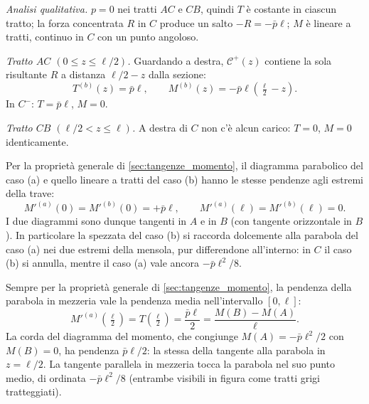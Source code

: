 \begin{esempio}
\begin{svolgimento}
		\textit{Analisi qualitativa.} $p = 0$ nei tratti
		$AC$ e $CB$, quindi $T$ è costante in ciascun
		tratto; la forza concentrata $R$ in $C$ produce
		un salto $-R = -\bar p\ell$; $M$ è lineare a
		tratti, continuo in $C$ con un punto angoloso.
		
		\textit{Tratto $AC$ $(0 \leq z \leq \ell/2)$.}
		Guardando a destra, $\mathcal{C}^+(z)$ contiene
		la sola risultante $R$ a distanza $\ell/2 - z$
		dalla sezione:
		\[
		T^{(b)}(z) = \bar p\ell,
		\qquad
		M^{(b)}(z) = -\bar p\ell\!\left(\tfrac{\ell}{2}-z\right).
		\]
		In $C^-$: $T = \bar p\ell$, $M = 0$.
		
		\textit{Tratto $CB$ $(\ell/2 < z \leq \ell)$.}
		A destra di $C$ non c'è alcun carico: $T = 0$,
		$M = 0$ identicamente.
		
		Per la proprietà generale di
		\ref{sec:tangenze_momento}, il diagramma parabolico
		del caso (a) e quello lineare a tratti del caso (b)
		hanno le stesse pendenze agli estremi della trave:
		\[
		M'^{(a)}(0) = M'^{(b)}(0) = +\bar p\ell,
		\qquad
		M'^{(a)}(\ell) = M'^{(b)}(\ell) = 0.
		\]
		I due diagrammi sono dunque tangenti in $A$ e in
		$B$ (con tangente orizzontale in $B$). In
		particolare la spezzata del caso (b) si raccorda
		dolcemente alla parabola del caso (a) nei due
		estremi della mensola, pur differendone
		all'interno: in $C$ il caso (b) si annulla, mentre
		il caso (a) vale ancora $-\bar p\ell^2/8$.
		
		Sempre per la proprietà generale di
		\ref{sec:tangenze_momento}, la pendenza della
		parabola in mezzeria vale la pendenza media
		nell'intervallo $[0,\ell]$:
		\[
		M'^{(a)}\!\left(\tfrac{\ell}{2}\right)
		= T\!\left(\tfrac{\ell}{2}\right)
		= \frac{\bar p\ell}{2}
		= \frac{M(B) - M(A)}{\ell}.
		\]
		La corda del diagramma del momento, che congiunge
		$M(A) = -\bar p\ell^2/2$ con $M(B) = 0$, ha
		pendenza $\bar p\ell/2$: la stessa della tangente
		alla parabola in $z = \ell/2$. La tangente parallela
		in mezzeria tocca la parabola nel suo punto medio,
		di ordinata $-\bar p\ell^2/8$ (entrambe visibili
		in figura come tratti grigi tratteggiati).
		
	\end{svolgimento}
\end{esempio}


